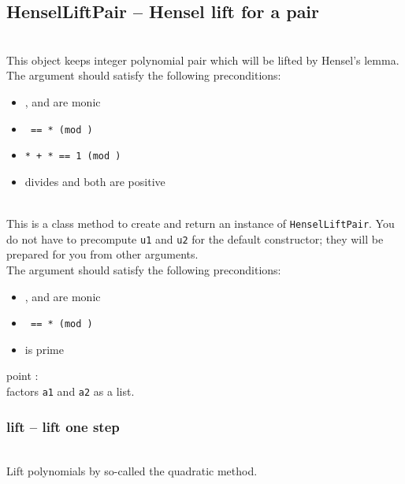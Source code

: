  \subsection{HenselLiftPair -- Hensel lift for a pair}
 \initialize
  \\
  \spacing
  \quad This object keeps integer polynomial pair which will be lifted by Hensel's lemma.
  \spacing
  \quad The argument should satisfy the following preconditions:
  \begin{itemize}
  \item {},  and  are monic
  \item {\tt {} == * (mod )}
  \item {\tt {}* + * == 1 (mod )}
  \item {} divides  and both are positive
  \end{itemize}
  \\
  \spacing
  \quad This is a class method to create and return an instance of {\tt HenselLiftPair}.
  You do not have to precompute {\tt u1} and {\tt u2} for the default constructor; they will be prepared for you from other arguments.\\
  \spacing
  \quad The argument should satisfy the following preconditions:
  \begin{itemize}
  \item {},  and  are monic
  \item {\tt {} == * (mod )}
  \item {} is prime
  \end{itemize}
  \begin{at}
    \item[point]:\\
      factors {\tt a1} and {\tt a2} as a list.
  \end{at}
  \method
  \subsubsection{lift -- lift one step}
  \\
  \spacing
  \quad Lift polynomials by so-called the quadratic method.
